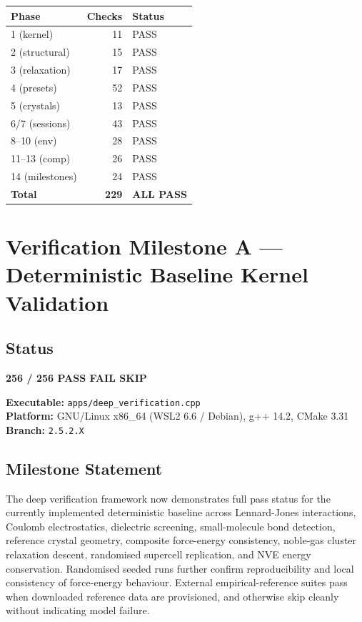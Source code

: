 \documentclass[11pt]{article}
\begin{document}
\begin{center}
\begin{tabular}{lrl}
\toprule
Phase & Checks & Status \\
\midrule
1 (kernel)     & 11 & PASS \\
2 (structural) & 15 & PASS \\
3 (relaxation) & 17 & PASS \\
4 (presets)    & 52 & PASS \\
5 (crystals)   & 13 & PASS \\
6/7 (sessions) & 43 & PASS \\
8--10 (env)    & 28 & PASS \\
11--13 (comp)  & 26 & PASS \\
14 (milestones)& 24 & PASS \\
\midrule
\textbf{Total} & \textbf{229} & \textbf{ALL PASS} \\
\bottomrule
\end{tabular}
\end{center}

\newpage
\section{Verification Milestone A --- Deterministic Baseline Kernel Validation}

\subsection{Status}

\begin{center}
\large\bfseries 256 / 256 \quad PASS  FAIL  SKIP
\end{center}

\noindent\textbf{Executable:} \texttt{apps/deep\_verification.cpp}\\
\textbf{Platform:} GNU/Linux x86\_64 (WSL2 6.6 / Debian), g++ 14.2, CMake 3.31\\
\textbf{Branch:} \texttt{2.5.2.X}

\subsection{Milestone Statement}

The deep verification framework now demonstrates full pass status for the
currently implemented deterministic baseline across Lennard-Jones interactions,
Coulomb electrostatics, dielectric screening, small-molecule bond detection,
reference crystal geometry, composite force-energy consistency, noble-gas
cluster relaxation descent, randomised supercell replication, and NVE energy
conservation. Randomised seeded runs further confirm reproducibility and local
consistency of force-energy behaviour. External empirical-reference suites pass
when downloaded reference data are provisioned, and otherwise skip cleanly
without indicating model failure.
\end{document}
